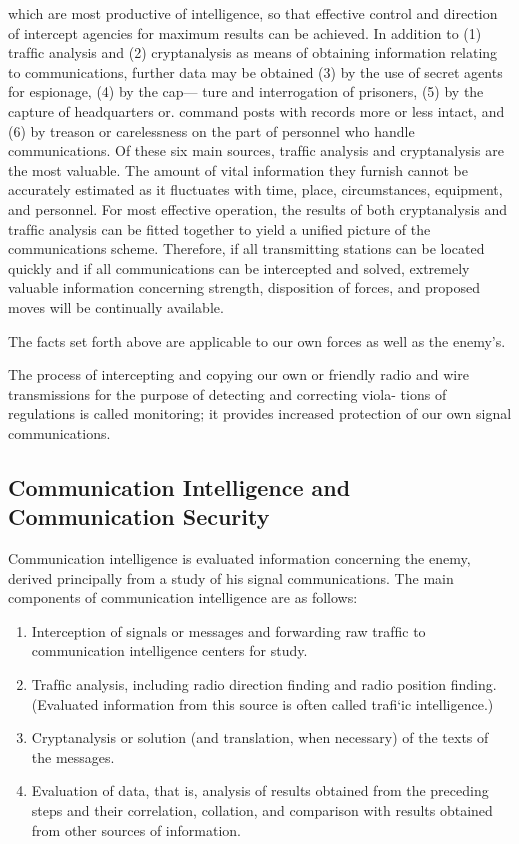 which are most productive of intelligence, so that effective control and
direction of intercept agencies for maximum results can be achieved.
\mypara In addition to (1) trafﬁc analysis and (2) cryptanalysis as means of
obtaining information relating to communications, further data may be
obtained (3) by the use of secret agents for espionage, (4) by the cap—
ture and interrogation of prisoners, (5) by the capture of headquarters
or. command posts with records more or less intact, and (6) by treason
or carelessness on the part of personnel who handle communications. Of
these six main sources, trafﬁc analysis and cryptanalysis are the most
valuable. The amount of vital information they furnish cannot be
accurately estimated as it ﬂuctuates with time, place, circumstances,
equipment, and personnel. For most effective operation, the results of
both cryptanalysis and trafﬁc analysis can be ﬁtted together to yield a
uniﬁed picture of the communications scheme. Therefore, if all transmitting stations can be located quickly and if all communications can be
intercepted and solved, extremely valuable information concerning
strength, disposition of forces, and proposed moves will be continually
available.

\mypara The facts set forth above are applicable to our own forces as well
as the enemy’s.

\mypara The process of intercepting and copying our own or friendly radio
and wire transmissions for the purpose of detecting and correcting viola-
tions of regulations is called monitoring; it provides increased protection
of our own signal communications.

\subsection{Communication Intelligence and Communication Security}

\mypara Communication intelligence is evaluated information concerning the
enemy, derived principally from a study of his signal communications.
The main components of communication intelligence are as follows:

\begin{enumerate}
\item Interception of signals or messages and forwarding raw trafﬁc
to communication intelligence centers for study.

\item Trafﬁc analysis, including radio direction ﬁnding and radio
position ﬁnding. (Evaluated information from this source is
often called traﬁ‘ic intelligence.)

\item Cryptanalysis or solution (and translation, when necessary) of
the texts of the messages.

\item Evaluation of data, that is, analysis of results obtained from the
preceding steps and their correlation, collation, and comparison
with results obtained from other sources of information.
\end{enumerate}

